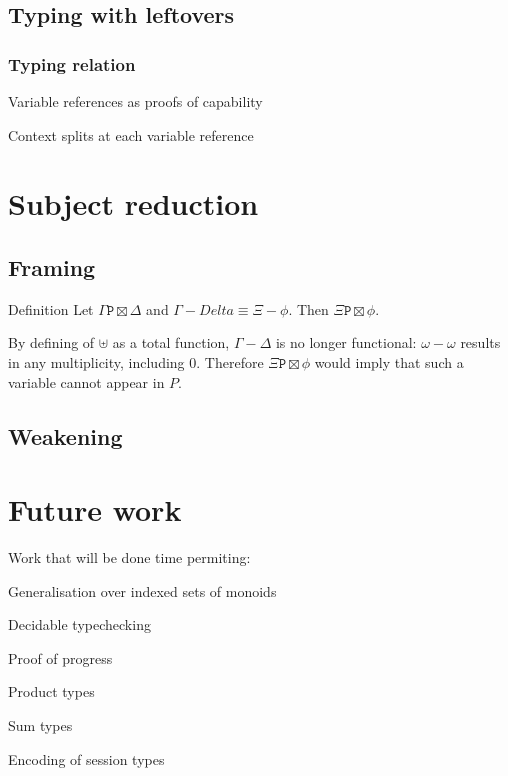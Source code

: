 \documentclass[a4paper,UKenglish,cleveref, autoref, thm-restate,authorcolumns]{lipics-v2019}
\newcommand{\type}{\texttt}
\begin{document}
\subsection{Typing with leftovers}

\subsubsection{Typing relation}

Variable references as proofs of capability

Context splits at each variable reference

\section{Subject reduction}

\subsection{Framing}

Definition
Let $\Gamma \type P \boxtimes \Delta$ and $\Gamma - Delta \equiv \Xi - \phi$.
Then $\Xi \type P \boxtimes \phi$.

By defining of $\uplus$ as a total function, $\Gamma - \Delta$ is no longer
functional: $\omega - \omega$ results in any multiplicity, including $0$. Therefore
$\Xi \type P \boxtimes \phi$ would imply that such a variable cannot appear in $P$.

\subsection{Weakening}

\section{Future work}

Work that will be done time permiting:

Generalisation over indexed sets of monoids

Decidable typechecking

Proof of progress

Product types

Sum types

Encoding of session types



\end{document}

